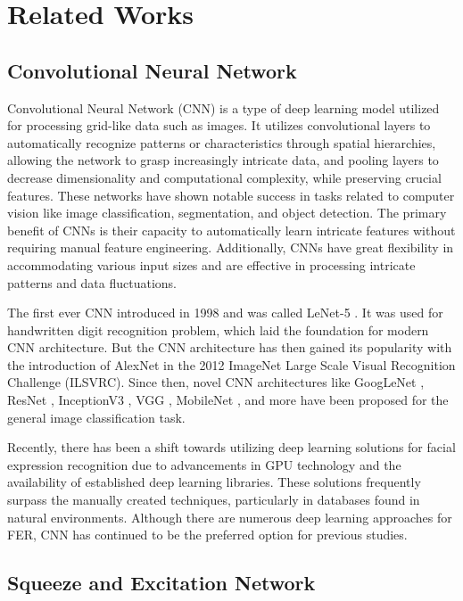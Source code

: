 \section{Related Works}

\subsection{Convolutional Neural Network}

Convolutional Neural Network (CNN) is a type of deep learning model utilized for processing grid-like data such as images. It utilizes convolutional layers to automatically recognize patterns or characteristics through spatial hierarchies, allowing the network to grasp increasingly intricate data, and pooling layers to decrease dimensionality and computational complexity, while preserving crucial features. These networks have shown notable success in tasks related to computer vision like image classification, segmentation, and object detection. The primary benefit of CNNs is their capacity to automatically learn intricate features without requiring manual feature engineering. Additionally, CNNs have great flexibility in accommodating various input sizes and are effective in processing intricate patterns and data fluctuations.

The first ever CNN introduced in 1998 and was called LeNet-5 \cite{lecun1998gradient}. It was used for handwritten digit recognition problem, which laid the foundation for modern CNN architecture. But the CNN architecture has then gained its popularity with the introduction of AlexNet \cite{krizhevsky2012imagenet} in the 2012 ImageNet Large Scale Visual Recognition Challenge (ILSVRC). Since then, novel CNN architectures like GoogLeNet \cite{szegedy2015going}, ResNet \cite{he2016deep}, InceptionV3 \cite{szegedy2016rethinking}, VGG \cite{simonyan2014very}, MobileNet \cite{howard2017mobilenets}, and more have been proposed for the general image classification task.

Recently, there has been a shift towards utilizing deep learning solutions for facial expression recognition due to advancements in GPU technology and the availability of established deep learning libraries. These solutions frequently surpass the manually created techniques, particularly in databases found in natural environments. Although there are numerous deep learning approaches for FER, CNN has continued to be the preferred option for previous studies.

\subsection{Squeeze and Excitation Network}

